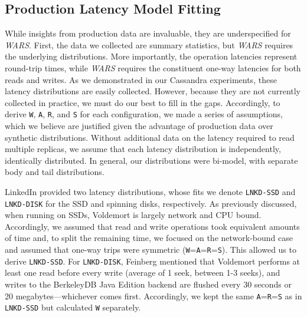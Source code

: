 \documentclass{vldb}
\newcommand{\subsectionskip}{-0em}
\begin{document}
\vspace{\subsectionskip}\subsection{Production Latency Model Fitting}

While insights from production data are invaluable, they are
underspecified for \textit{WARS}.  First, the data we collected are
summary statistics, but \textit{WARS} requires the underlying
distributions.  More importantly, the operation latencies represent
round-trip times, while \textit{WARS} requires the constituent one-way
latencies for both reads and writes.  As we demonstrated in our
Cassandra experiments, these latency distributions are easily
collected.  However, because they are not currently collected in
practice, we must do our best to fill in the gaps. Accordingly, to
derive \texttt{W}, \texttt{A}, \texttt{R}, and \texttt{S} for each
configuration, we made a series of assumptions, which we believe are
justified given the advantage of production data over synthetic
distributions.  Without additional data on the latency required to
read multiple replicas, we assume that each latency distribution is
independently, identically distributed.  In general, our distributions
were bi-model, with separate body and tail distributions.

LinkedIn provided two latency distributions, whose fits we denote
\texttt{LNKD-SSD} and \texttt{LNKD-DISK} for the SSD and spinning
disks, respectively.  As previously discussed, when running on SSDs,
Voldemort is largely network and CPU bound.  Accordingly, we assumed
that read and write operations took equivalent amounts of time and, to
split the remaining time, we focused on the network-bound case and
assumed that one-way trips were symmetric
(\texttt{W}=\texttt{A}=\texttt{R}=\texttt{S}).  This allowed us to
derive \texttt{LNKD-SSD}.  For \texttt{LNKD-DISK}, Feinberg mentioned
that Voldemort performs at least one read before every write (average
of 1 seek, between 1-3 seeks), and writes to the BerkeleyDB Java
Edition backend are flushed every 30 seconds or 20
megabytes---whichever comes first.  Accordingly, we kept the same
\texttt{A}=\texttt{R}=\texttt{S} as in \texttt{LNKD-SSD} but
calculated \texttt{W} separately.
\end{document}
